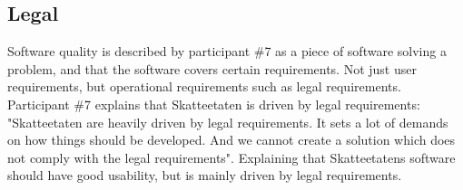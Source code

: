 




\subsection{Legal} \label{sec:legal}
Software quality is described by participant \#7 as a piece of software solving a problem, and that the software covers certain requirements. Not just user requirements, but operational requirements such as legal requirements. Participant \#7 explains that Skatteetaten is driven by legal requirements: "Skatteetaten are heavily driven by legal requirements. It sets a lot of demands on how things should be developed. And we cannot create a solution which does not comply with the legal requirements". Explaining that Skatteetatens software should have good usability, but is mainly driven by legal requirements.

